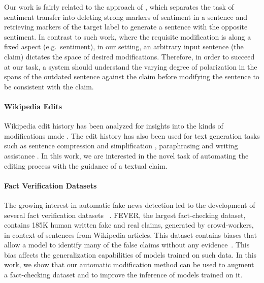 \documentclass[letterpaper]{article} %
\begin{document}
Our work is fairly related to the approach of \cite{li-etal-2018-delete}, which separates the task of sentiment transfer into deleting strong markers of sentiment in a sentence and retrieving markers of the target label to generate a sentence with the opposite sentiment. In contrast to such work, where the requisite modification is along a fixed aspect (e.g.\ sentiment), in our setting, an arbitrary input sentence (the claim) dictates the space of desired modifications. Therefore, in order to succeed at our task, a system should understand the varying degree of polarization in the spans of the outdated sentence against the claim before modifying the sentence to be consistent with the claim.%

\paragraph{Wikipedia Edits}
Wikipedia edit history has been analyzed for insights into the kinds of modifications made
\cite{daxenberger-gurevych-2013-automatically,yang-etal-2017-identifying-semantic,faruqui-etal-2018-wikiatomicedits}. The edit history has also been used for text generation tasks such as sentence compression and simplification
\cite{yatskar-etal-2010-sake}, paraphrasing \cite{max-wisniewski-2010-mining} and writing assistance
\cite{cahill-etal-2013-robust}. In this work, we are interested in the novel task of automating the editing process with the guidance of a textual claim.

\paragraph{Fact Verification Datasets}

The growing interest in automatic fake news detection led to the development of several fact verification datasets
~\cite{vlachos-riedel-2014-fact,wang-2017-liar,rashkin-etal-2017-truth,fever}. FEVER, the largest fact-checking dataset, contains 185K human written fake and real claims, generated by crowd-workers, in context of sentences from Wikipedia articles.
This dataset contains biases that allow a model to identify many of the false claims without any evidence~\cite{schuster2019towards}.
This bias affects the generalization capabilities of models trained on such data.
In this work, we show that our automatic modification method can be used to augment a fact-checking dataset and to improve the inference of models trained on it.
\end{document}
